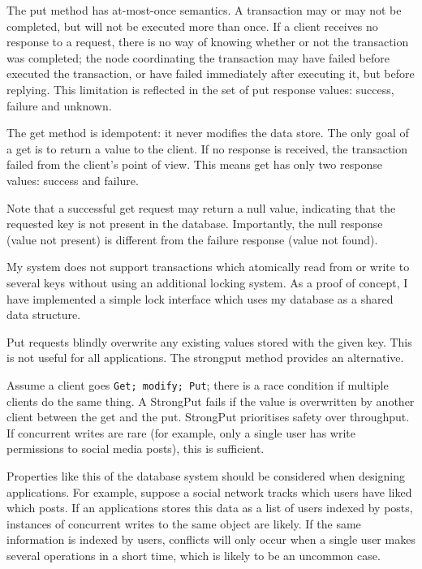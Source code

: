 \documentclass[12pt,a4paper,twoside,openany]{report}
\begin{document}
The put method has at-most-once semantics. A transaction may or may not be completed, but will not be executed more than once. If a client receives no response to a request, there is no way of knowing whether or not the transaction was completed; the node coordinating the transaction may have failed before executed the transaction, or have failed immediately after executing it, but before replying. This limitation is reflected in the set of put response values: success, failure and unknown.

The get method is idempotent: it never modifies the data store. The only goal of a get is to return a value to the client. If no response is received, the transaction failed from the client's point of view. This means get has only two response values: success and failure.

Note that a successful get request may return a null value, indicating that the requested key is not present in the database. Importantly, the null response (value not present) is different from the failure response (value not found).

My system does not support transactions which atomically read from or write to several keys without using an additional locking system. As a proof of concept, I have implemented a simple lock interface which uses my database as a shared data structure.

Put requests blindly overwrite any existing values stored with the given key. This is not useful for all applications. The strongput method provides an alternative.

Assume a client goes \verb|Get; modify; Put|; there is a race condition if multiple clients do the same thing. A StrongPut fails if the value is overwritten by another client between the get and the put. StrongPut prioritises safety over throughput. If concurrent writes are rare (for example, only a single user has write permissions to social media posts), this is sufficient.

Properties like this of the database system should be considered when designing applications. For example, suppose a social network tracks which users have liked which posts. If an applications stores this data as a list of users indexed by posts, instances of concurrent writes to the same object are likely. If the same information is indexed by users, conflicts will only occur when a single user makes several operations in a short time, which is likely to be an uncommon case.
\end{document}
